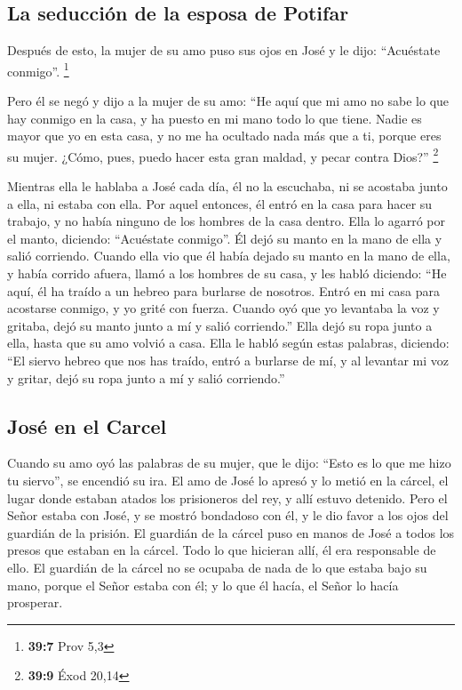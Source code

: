 \begin{paracol}{2}
\hypertarget{la-seducciuxf3n-de-la-esposa-de-potifar}{%
\subsection{La seducción de la esposa de
Potifar}\label{la-seducciuxf3n-de-la-esposa-de-potifar}}

 Después de esto, la mujer de su amo puso sus ojos en José
y le dijo: ``Acuéstate conmigo''. \footnote{\textbf{39:7} Prov 5,3}

 Pero él se negó y dijo a la mujer de su amo: ``He aquí
que mi amo no sabe lo que hay conmigo en la casa, y ha puesto en mi mano
todo lo que tiene.  Nadie es mayor que yo en esta casa, y
no me ha ocultado nada más que a ti, porque eres su mujer. ¿Cómo, pues,
puedo hacer esta gran maldad, y pecar contra Dios?'' \footnote{\textbf{39:9}
  Éxod 20,14}

 Mientras ella le hablaba a José cada día, él no la
escuchaba, ni se acostaba junto a ella, ni estaba con ella.
 Por aquel entonces, él entró en la casa para hacer su
trabajo, y no había ninguno de los hombres de la casa dentro.
 Ella lo agarró por el manto, diciendo: ``Acuéstate
conmigo''. Él dejó su manto en la mano de ella y salió corriendo.
 Cuando ella vio que él había dejado su manto en la mano
de ella, y había corrido afuera,  llamó a los hombres de
su casa, y les habló diciendo: ``He aquí, él ha traído a un hebreo para
burlarse de nosotros. Entró en mi casa para acostarse conmigo, y yo
grité con fuerza.  Cuando oyó que yo levantaba la voz y
gritaba, dejó su manto junto a mí y salió corriendo.'' 
Ella dejó su ropa junto a ella, hasta que su amo volvió a casa.
 Ella le habló según estas palabras, diciendo: ``El
siervo hebreo que nos has traído, entró a burlarse de mí,
 y al levantar mi voz y gritar, dejó su ropa junto a mí y
salió corriendo.''

\hypertarget{josuxe9-en-el-carcel}{%
\subsection{José en el Carcel}\label{josuxe9-en-el-carcel}}

 Cuando su amo oyó las palabras de su mujer, que le dijo:
``Esto es lo que me hizo tu siervo'', se encendió su ira.
 El amo de José lo apresó y lo metió en la cárcel, el
lugar donde estaban atados los prisioneros del rey, y allí estuvo
detenido.  Pero el Señor estaba con José, y se mostró
bondadoso con él, y le dio favor a los ojos del guardián de la prisión.
 El guardián de la cárcel puso en manos de José a todos
los presos que estaban en la cárcel. Todo lo que hicieran allí, él era
responsable de ello.  El guardián de la cárcel no se
ocupaba de nada de lo que estaba bajo su mano, porque el Señor estaba
con él; y lo que él hacía, el Señor lo hacía prosperar.


\end{paracol}
